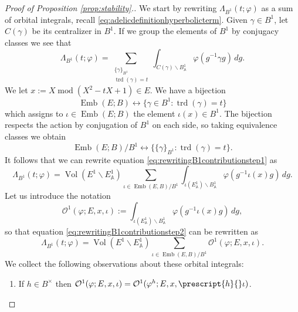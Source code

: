 \documentclass{article}
\theoremstyle{named}
\newcommand{\A}{\mathbb{A}}
\renewcommand{\O}{\mathcal{O}}
\DeclareMathOperator{\vol}{Vol}
\DeclareMathOperator{\modulo}{mod}
\DeclareMathOperator{\Emb}{Emb}
\DeclareMathOperator{\trd}{trd}
\begin{document}
\begin{proof}[Proof of Proposition \ref{prop:stability}.]
We start by rewriting $\Lambda_{B^1}(t; \varphi)$ as a sum of orbital integrals, recall \eqref{eq:adelicdefinitionhyperbolicterm}. Given $\gamma \in B^1$, let $C(\gamma)$ be its centralizer in $B^1$. If we group the elements of $B^1$ by conjugacy classes we see that
\begin{equation}\label{eq:rewritingB1contributionstep1}
    \Lambda_{B^1}(t; \varphi) = \sum_{\substack{\{\gamma\}_{B^1}\\
    \trd(\gamma)= t}} \int_{C(\gamma)\backslash B^1_\A}\varphi(g^{-1}\gamma g)\, dg.
\end{equation}
We let $x := X \modulo (X^2 - tX + 1) \in E$. We have a bijection 
\begin{equation*}
    \Emb(E; B) \longleftrightarrow \{\gamma \in B^1: \trd(\gamma) = t\}
\end{equation*}
which assigns to $\iota \in \Emb(E; B)$ the element $\iota(x) \in B^1$. The bijection respects the action by conjugation of $B^1$ on each side, so taking equivalence classes we obtain
\begin{equation*}
    \Emb(E; B)/B^1 \longleftrightarrow \{\{\gamma\}_{B^1}: \trd(\gamma) = t\}.
\end{equation*}
It follows that we can rewrite equation \eqref{eq:rewritingB1contributionstep1} as 
\begin{equation}\label{eq:rewritingB1contributionstep2}
    \Lambda_{B^1}(t; \varphi) = \vol(E^1 \backslash E^1_\A) \sum_{\iota \in \Emb(E, B)/B^1} \int_{\iota(E_\A^1)\backslash B_\A^1}\varphi(g^{-1}\iota(x)g) \, dg.
\end{equation}
Let us introduce the notation
\begin{equation}\label{eq:defiglobalorbitalB1}
    \O^1(\varphi; E, x, \iota) := \int_{\iota(E^1_\A)\backslash B_\A^1}\varphi(g^{-1}\iota(x)g)\, dg,
\end{equation}
so that equation \eqref{eq:rewritingB1contributionstep2} can be rewritten as
\begin{equation}\label{eq:rewritingB1contributionstep3}
    \Lambda_{B^1}(t; \varphi)  = \vol(E^1 \backslash E^1_\A) \sum_{\iota \in \Emb(E, B)/B^1} \O^1(\varphi; E, x, \iota).
\end{equation}
We collect the following observations about these orbital integrals:
\begin{enumerate}
    \item [i)] If $h \in B^\times$ then $\O^1(\varphi; E, x, \iota) = \O^1(\varphi^h; E, x, \prescript{h}{}\iota)$.

\end{enumerate}
\end{proof}
\end{document}
